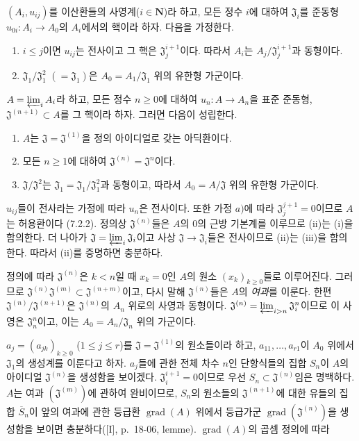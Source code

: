 \begin{proposition}[7.2.7]
\label{0.7.2.7-ko}
$(A_i,u_{ij})$를 이산환들의 사영계($i\in\mathbf N$)라 하고, 모든
정수 $i$에 대하여 $\mathfrak J_i$를 준동형
$u_{0i}:A_i\to A_0$의 $A_i$에서의 핵이라 하자. 다음을 가정한다.
\begin{enumerate}
  \item[$a)$] $i\leq j$이면 $u_{ij}$는 전사이고 그 핵은
    $\mathfrak J_j^{i+1}$이다. 따라서 $A_i$는
    $A_j/\mathfrak J_j^{i+1}$과 동형이다.
  \item[$b)$] $\mathfrak J_1/\mathfrak J_1^2$
    $(=\mathfrak J_1)$은 $A_0=A_1/\mathfrak J_1$ 위의 유한형
    가군이다.
\end{enumerate}
$A=\varprojlim_i A_i$라 하고, 모든 정수 $n\geq0$에 대하여
$u_n:A\to A_n$을 표준 준동형, $\mathfrak J^{(n+1)}\subset A$를
그 핵이라 하자. 그러면 다음이 성립한다.
\begin{enumerate}
  \item[(i)] $A$는 $\mathfrak J=\mathfrak J^{(1)}$을 정의
    아이디얼로 갖는 아딕환이다.
  \item[(ii)] 모든 $n\geq1$에 대하여
    $\mathfrak J^{(n)}=\mathfrak J^n$이다.
  \item[(iii)] $\mathfrak J/\mathfrak J^2$는
    $\mathfrak J_1=\mathfrak J_1/\mathfrak J_1^2$과 동형이고,
    따라서 $A_0=A/\mathfrak J$ 위의 유한형 가군이다.
\end{enumerate}
\end{proposition}

$u_{ij}$들이 전사라는 가정에 따라 $u_n$은 전사이다. 또한 가정
$a)$에 따라 $\mathfrak J_j^{j+1}=0$이므로 $A$는 허용환이다
(7.2.2). 정의상 $\mathfrak J^{(n)}$들은 $A$의 $0$의 근방
기본계를 이루므로 (ii)는 (i)을 함의한다. 더 나아가
$\mathfrak J=\varprojlim_i\mathfrak J_i$이고 사상
$\mathfrak J\to\mathfrak J_i$들은 전사이므로 (ii)는 (iii)을
함의한다. 따라서 (ii)를 증명하면 충분하다.

정의에 따라 $\mathfrak J^{(n)}$은 $k<n$일 때 $x_k=0$인 $A$의
원소 $(x_k)_{k\geq0}$들로 이루어진다. 그러므로
$\mathfrak J^{(n)}\mathfrak J^{(m)}\subset
\mathfrak J^{(n+m)}$이고, 다시 말해 $\mathfrak J^{(n)}$들은
$A$의 \emph{여과}를 이룬다. 한편
$\mathfrak J^{(n)}/\mathfrak J^{(n+1)}$은
$\mathfrak J^{(n)}$의 $A_n$ 위로의 사영과 동형이다.
$\mathfrak J^{(n)}=\varprojlim_{i>n}\mathfrak J_i^n$이므로 이
사영은 $\mathfrak J_n^n$이고, 이는
$A_0=A_n/\mathfrak J_n$ 위의 가군이다.

$a_j=(a_{jk})_{k\geq0}$ ($1\leq j\leq r$)를
$\mathfrak J=\mathfrak J^{(1)}$의 원소들이라 하고,
$a_{11},\ldots,a_{r1}$이 $A_0$ 위에서 $\mathfrak J_1$의 생성계를
이룬다고 하자. $a_j$들에 관한 전체 차수 $n$인 단항식들의 집합
$S_n$이 $A$의 아이디얼 $\mathfrak J^{(n)}$을 생성함을 보이겠다.
$\mathfrak J_i^{i+1}=0$이므로 우선
$S_n\subset\mathfrak J^{(n)}$임은 명백하다. $A$는 여과
$(\mathfrak J^{(m)})$에 관하여 완비이므로, $S_n$의 원소들의
$\mathfrak J^{(n+1)}$에 대한 유들의 집합 $\overline S_n$이 앞의
여과에 관한 등급환 $\operatorname{grad}(A)$ 위에서 등급가군
$\operatorname{grad}(\mathfrak J^{(n)})$을 생성함을 보이면
충분하다([I], p.~18-06, lemme). $\operatorname{grad}(A)$의 곱셈
정의에 따라

